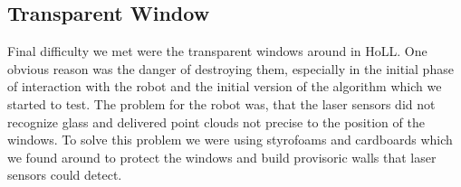 \subsection{Transparent Window}
Final difficulty we met were the transparent windows around in HoLL. One obvious reason was the danger of destroying them, especially in the initial phase of interaction with the robot and the initial version of the algorithm which we started to test. The problem for the robot was, that the laser sensors did not recognize glass and delivered point clouds not precise to the position of the windows. To solve this problem we were using styrofoams and cardboards which we found around to protect the windows and build provisoric walls that laser sensors could detect.

